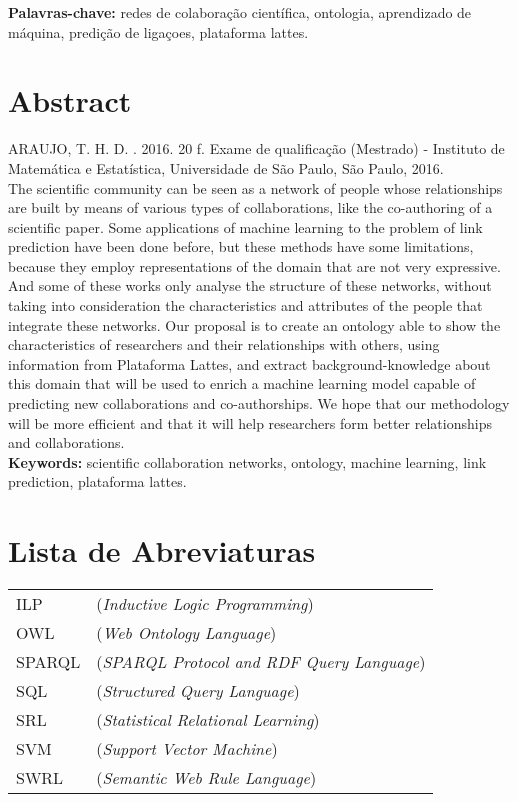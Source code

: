 \documentclass[11pt,twoside,a4paper]{book}
\begin{document}
\noindent \textbf{Palavras-chave:} redes de colaboração científica, ontologia, aprendizado de máquina, predição de ligaçoes, plataforma lattes.

\chapter*{Abstract}
\noindent ARAUJO, T. H. D. \textbf{\mydocumenttitle}.
2016. 20 f.
Exame de qualificação (Mestrado) - Instituto de Matemática e Estatística,
Universidade de São Paulo, São Paulo, 2016.
\\

The scientific community can be seen as a network of people whose relationships are built by means of various types of collaborations, like the co-authoring of a scientific paper. Some applications of machine learning to the problem of link prediction have been done before, but these methods have some limitations, because they employ representations of the domain that are not very expressive. And some of these works only analyse the structure of these networks, without taking into consideration the characteristics and attributes of the people that integrate these networks. Our proposal is to create an ontology able to show the characteristics of researchers and their relationships with others, using information from Plataforma Lattes, and extract background-knowledge about this domain that will be used to enrich a machine learning model capable of predicting new collaborations and co-authorships. We hope that our methodology will be more efficient and that it will help researchers form better relationships and collaborations.
\\

\noindent \textbf{Keywords:} scientific collaboration networks, ontology, machine learning, link prediction, plataforma lattes.


\tableofcontents    %

\chapter{Lista de Abreviaturas}
\begin{tabular}{ll}
        ILP         & (\textit{Inductive Logic Programming})\\
        OWL         & (\textit{Web Ontology Language})\\
        SPARQL      & (\textit{SPARQL Protocol and RDF Query Language})\\
        SQL         & (\textit{Structured Query Language})\\
        SRL         & (\textit{Statistical Relational Learning})\\
        SVM         & (\textit{Support Vector Machine})\\
        SWRL        & (\textit{Semantic Web Rule Language})\\
\end{tabular}
\end{document}
